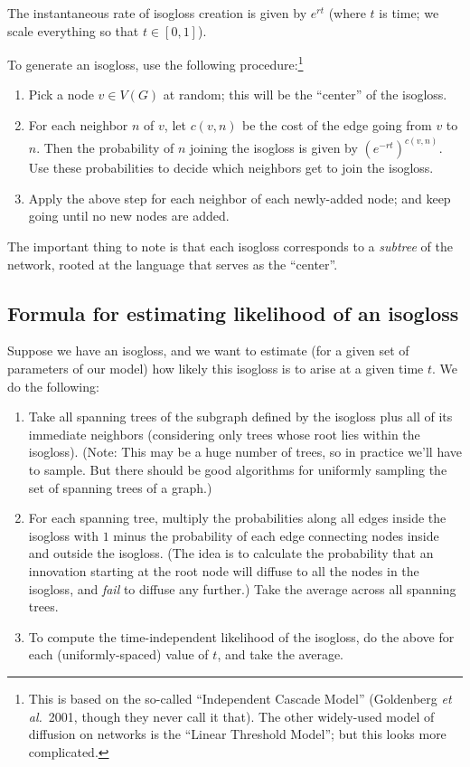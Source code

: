 \documentclass[12pt,onecolumn]{article}
\begin{document}
The instantaneous rate of isogloss creation is given by \(e^{rt}\) (where \(t\) is time; we scale everything so that \(t \in [0,1]\)).

To generate an isogloss, use the following procedure:\footnote{This is based on the so-called “Independent Cascade Model” (Goldenberg \emph{et al.}~2001, though they never call it that). The other widely-used model of diffusion on networks is the “Linear Threshold Model”; but this looks more complicated.}
\begin{enumerate}
\item Pick a node \(v \in V(G)\) at random; this will be the “center” of the isogloss.
\item For each neighbor \(n\) of \(v\), let \(c(v,n)_{}\) be the cost of the edge going from \(v\) to \(n\). Then the probability of \(n\) joining the isogloss is given by \((e^{-rt})^{c(v,n)}^{}\). Use these probabilities to decide which neighbors get to join the isogloss.
\item Apply the above step for each neighbor of each newly-added node; and keep going until no new nodes are added.
\end{enumerate}

The important thing to note is that each isogloss corresponds to a \emph{subtree} of the network, rooted at the language that serves as the “center”.
\subsection{Formula for estimating likelihood of an isogloss}
\label{sec:org97dfe6d}
Suppose we have an isogloss, and we want to estimate (for a given set of parameters of our model) how likely this isogloss is to arise at a given time \(t\). We do the following:
\begin{enumerate}
\item Take all spanning trees of the subgraph defined by the isogloss plus all of its immediate neighbors (considering only trees whose root lies within the isogloss). (Note: This may be a huge number of trees, so in practice we’ll have to sample. But there should be good algorithms for uniformly sampling the set of spanning trees of a graph.)
\item For each spanning tree, multiply the probabilities along all edges inside the isogloss with \(1\) minus the probability of each edge connecting nodes inside and outside the isogloss. (The idea is to calculate the probability that an innovation starting at the root node will diffuse to all the nodes in the isogloss, and \emph{fail} to diffuse any further.) Take the average across all spanning trees.
\item To compute the time-independent likelihood of the isogloss, do the above for each (uniformly-spaced) value of \(t\), and take the average.
\end{enumerate}
\end{document}

